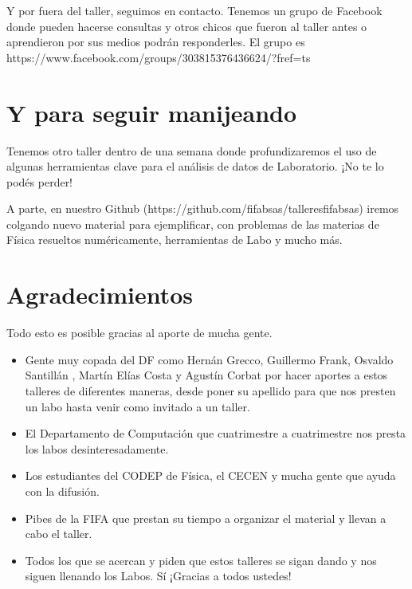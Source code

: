 \documentclass{article}
\begin{document}
Y por fuera del taller, seguimos en contacto. Tenemos un grupo de
Facebook donde pueden hacerse consultas y otros chicos que fueron al
taller antes o aprendieron por sus medios podrán responderles. El grupo
es https://www.facebook.com/groups/303815376436624/?fref=ts

    \section{Y para seguir manijeando}\label{y-para-seguir-manijeando}

Tenemos otro taller dentro de una semana donde profundizaremos el uso de
algunas herramientas clave para el análisis de datos de Laboratorio. ¡No
te lo podés perder!

A parte, en nuestro Github
(https://github.com/fifabsas/talleresfifabsas) iremos colgando nuevo
material para ejemplificar, con problemas de las materias de Física
resueltos numéricamente, herramientas de Labo y mucho más.

    \section{Agradecimientos}\label{agradecimientos}

Todo esto es posible gracias al aporte de mucha gente.

\begin{itemize}
\itemsep1pt\parskip0pt
\item
  Gente muy copada del DF como Hernán Grecco, Guillermo Frank, Osvaldo
  Santillán , Martín Elías Costa y Agustín Corbat por hacer aportes a
  estos talleres de diferentes maneras, desde poner su apellido para que
  nos presten un labo hasta venir como invitado a un taller.
\item
  El Departamento de Computación que cuatrimestre a cuatrimestre nos
  presta los labos desinteresadamente.
\item
  Los estudiantes del CODEP de Física, el CECEN y mucha gente que ayuda
  con la difusión.
\item
  Pibes de la FIFA que prestan su tiempo a organizar el material y
  llevan a cabo el taller.
\item
  Todos los que se acercan y piden que estos talleres se sigan dando y
  nos siguen llenando los Labos. Sí ¡Gracias a todos ustedes!
\end{itemize}


    
    
    
    
\end{document}
